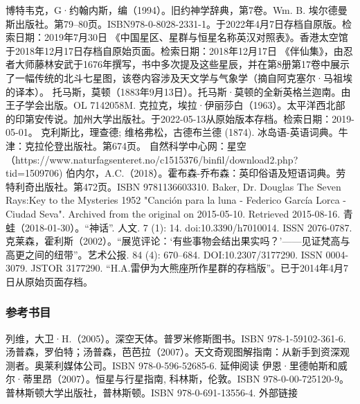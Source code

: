  博特韦克，G·约翰内斯，编（1994）。旧约神学辞典，第7卷。Wm. B. 埃尔德曼斯出版社。第79–80页。ISBN978-0-8028-2331-1。于2022年4月7日存档自原版。检索日期：2019年7月30日
 《中国星区、星群与恒星名称英汉对照表》。香港太空馆于2018年12月17日存档自原始页面。检索日期：2018年12月17日
 《伴仙集》，由忍者大师藤林安武于1676年撰写，书中多次提及这些星辰，并在第8册第17卷中展示了一幅传统的北斗七星图，该卷内容涉及天文学与气象学（摘自阿克塞尔·马祖埃的译本）。
 托马斯，莫顿（1883年9月13日）。托马斯·莫顿的全新英格兰迦南。由王子学会出版。OL 7142058M.
 克拉克，埃拉·伊丽莎白（1963）。太平洋西北部的印第安传说。加州大学出版社。于2022-05-13从原始版本存档。检索日期：2019-05-01。
 克利斯比，理查德; 维格弗松，古德布兰德 (1874). 冰岛语-英语词典。牛津：克拉伦登出版社。第674页。
 自然科学中心网：星空（https://www.naturfagsenteret.no/c1515376/binfil/download2.php?tid=1509706)
 伯内尔，A.C.（2018）。霍布森-乔布森：英印俗语及短语词典。劳特利奇出版社。第472页。ISBN 9781136603310.
 Baker, Dr. Douglas The Seven Rays:Key to the Mysteries 1952
 "Canción para la luna - Federico García Lorca - Ciudad Seva". Archived from the original on 2015-05-10. Retrieved 2015-08-16.
 青蛙（2018-01-30）。“神话”. 人文. 7 (1): 14. doi:10.3390/h7010014. ISSN 2076-0787.
 克莱森，霍利斯（2002）。“展览评论：‘有些事物会结出果实吗？’——见证梵高与高更之间的纽带”。艺术公报. 84 (4): 670–684. DOI:10.2307/3177290. ISSN 0004-3079. JSTOR 3177290.
 “H.A.雷伊为大熊座所作星群的存档版”。已于2014年4月7日从原始页面存档。
\subsubsection{参考书目}
列维，大卫·H.（2005）。深空天体。普罗米修斯图书。ISBN 978-1-59102-361-6.
汤普森，罗伯特；汤普森，芭芭拉（2007）。天文奇观图解指南：从新手到资深观测者。奥莱利媒体公司。ISBN 978-0-596-52685-6.
延伸阅读
伊恩·里德帕斯和威尔·蒂里昂（2007）。恒星与行星指南, 科林斯，伦敦。ISBN 978-0-00-725120-9。普林斯顿大学出版社，普林斯顿。ISBN 978-0-691-13556-4.
外部链接
